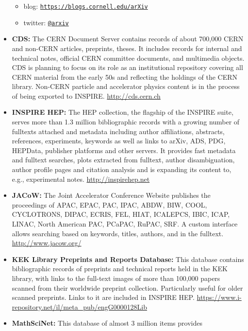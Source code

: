 \begin{itemize}
  \begin{itemize}
  \tightlist
  \item
    blog:
    \href{https://blogs.cornell.edu/arXiv}{\texttt{https://blogs.cornell.edu/arXiv}}
  \item
    twitter: \href{https://twitter.com/arxiv}{\texttt{@arxiv}}
  \end{itemize}
\item
  \textbf{CDS:} The CERN Document Server contains records of about
  700,000 CERN and non-CERN articles, preprints, theses. It includes
  records for internal and technical notes, official CERN committee
  documents, and multimedia objects. CDS is planning to focus on its
  role as an institutional repository covering all CERN material from
  the early 50s and reflecting the holdings of the CERN library.
  Non-CERN particle and accelerator physics content is in the process of
  being exported to INSPIRE. \url{http://cds.cern.ch}
\item
  \textbf{INSPIRE HEP:} The HEP collection, the flagship of the INSPIRE
  suite, serves more than 1.3 million bibliographic records with a
  growing number of fulltexts attached and metadata including author
  affiliations, abstracts, references, experiments, keywords as well as
  links to arXiv, ADS, PDG, HEPData, publisher platforms and other
  servers. It provides fast metadata and fulltext searches, plots
  extracted from fulltext, author disambiguation, author profile pages
  and citation analysis and is expanding its content to, e.g.,
  experimental notes. \url{http://inspirehep.net}
\item
  \textbf{JACoW:} The Joint Accelerator Conference Website publishes the
  proceedings of APAC, EPAC, PAC, IPAC, ABDW, BIW, COOL, CYCLOTRONS,
  DIPAC, ECRIS, FEL, HIAT, ICALEPCS, IBIC, ICAP, LINAC, North American
  PAC, PCaPAC, RuPAC, SRF. A custom interface allows searching based on
  keywords, titles, authors, and in the fulltext.
  \url{http://www.jacow.org/}
\item
  \textbf{KEK Library Preprints and Reports Database:} This database
  contains bibliographic records of preprints and technical reports held
  in the KEK library, with links to the full-text images of more than
  100,000 papers scanned from their worldwide preprint collection.
  Particularly useful for older scanned preprints. Links to it are
  included in INSPIRE HEP.
  \url{https://www.i-repository.net/il/meta_pub/engG0000128Lib}
\item
  \textbf{MathSciNet:} This database of almost 3 million items provides

\end{itemize}
